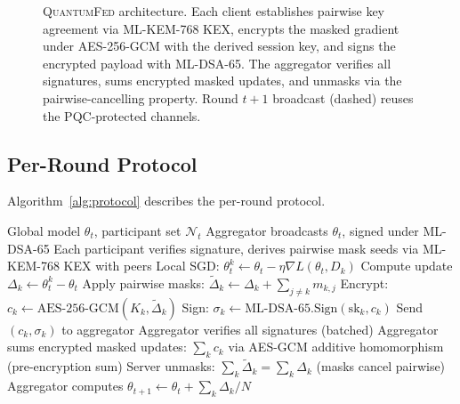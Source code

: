 \documentclass[sigconf,nonacm]{acmart}
\begin{document}
\begin{figure}[t]
\caption{\textsc{QuantumFed} architecture. Each client establishes
  pairwise key agreement via ML-KEM-768 KEX, encrypts the masked
  gradient under AES-256-GCM with the derived session key, and signs
  the encrypted payload with ML-DSA-65. The aggregator verifies all
  signatures, sums encrypted masked updates, and unmasks via the
  pairwise-cancelling property. Round $t+1$ broadcast (dashed) reuses
  the PQC-protected channels.}
\label{fig:framework}
\end{figure}

\subsection{Per-Round Protocol}

Algorithm~\ref{alg:protocol} describes the per-round protocol.

\begin{algorithm}[h]
\caption{QuantumFed per-round protocol}
\label{alg:protocol}
\begin{algorithmic}[1]
\REQUIRE Global model $\theta_t$, participant set $\mathcal{N}_t$
\STATE Aggregator broadcasts $\theta_t$, signed under ML-DSA-65
\STATE Each participant verifies signature, derives pairwise mask
       seeds via ML-KEM-768 KEX with peers
  \STATE Local SGD: $\theta_t^k \leftarrow \theta_t - \eta \nabla L(\theta_t, D_k)$
  \STATE Compute update $\Delta_k \leftarrow \theta_t^k - \theta_t$
  \STATE Apply pairwise masks: $\tilde{\Delta}_k \leftarrow \Delta_k + \sum_{j \neq k} m_{k,j}$
  \STATE Encrypt: $c_k \leftarrow \text{AES-256-GCM}(K_k, \tilde{\Delta}_k)$
  \STATE Sign: $\sigma_k \leftarrow \text{ML-DSA-65.Sign}(\text{sk}_k, c_k)$
  \STATE Send $(c_k, \sigma_k)$ to aggregator
\ENDFOR
\STATE Aggregator verifies all signatures (batched)
\STATE Aggregator sums encrypted masked updates: $\sum_k c_k$ via
       AES-GCM additive homomorphism (pre-encryption sum)
\STATE Server unmasks: $\sum_k \tilde{\Delta}_k = \sum_k \Delta_k$
       (masks cancel pairwise)
\STATE Aggregator computes $\theta_{t+1} \leftarrow \theta_t + \sum_k \Delta_k / N$
\end{algorithmic}
\end{algorithm}
\end{document}
